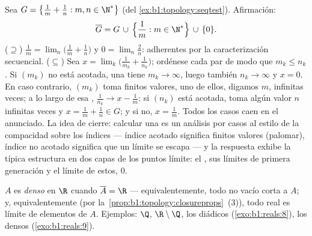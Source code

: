 \begin{example}\label{ex:b1:topology:closurecomputed}
Sea $G = \bigl\{\frac1m + \frac1n : m, n \in \N^*\bigr\}$ (del
\cref{ex:b1:topology:seqtest}). Afirmación:
\[
\overline G = G \,\cup\, \Bigl\{\frac1m : m \in \N^*\Bigr\}
\,\cup\, \{0\} .
\]
($\supseteq$) $\frac1m = \lim_n \bigl(\frac1m + \frac1n\bigr)$ y
$0 = \lim_n \frac2n$: adherentes por la caracterización secuencial.
($\subseteq$) Sea $x = \lim_k \bigl(\frac{1}{m_k} +
\frac{1}{n_k}\bigr)$; ordénese cada par de modo que $m_k \leq n_k$. Si
$(m_k)$ no está acotada, una  tiene $m_k \to \infty$, luego
también $n_k \to \infty$ y $x = 0$. En caso contrario, $(m_k)$ toma
finitos valores, uno de ellos, digamos $m$, infinitas veces; a lo
largo de esa , $\frac{1}{n_k} \to x - \frac1m$: si $(n_k)$
está acotada, toma algún valor $n$ infinitas veces y
$x = \frac1m + \frac1n \in G$; y si no, $x = \frac1m$. Todos los casos
caen en el  anunciado. La idea de cierre: calcular una
 es un análisis por casos al estilo de la compacidad sobre
los índices --- índice acotado significa finitos valores (palomar),
índice no acotado significa que un límite se escapa --- y la respuesta
exhibe la típica estructura en dos capas de los puntos límite: el
, sus límites de primera generación y el límite de estos, $0$.
\end{example}

\begin{definition}\label{def:b1:topology:dense}
$A$ es \emph{denso} en $\R$ cuando $\overline A = \R$
--- equivalentemente, todo   no vacío corta a $A$; y,
equivalentemente (por la~\cref{prop:b1:topology:closureprops}~(3)),
todo real es límite de elementos de $A$. Ejemplos: $\Q$,
$\R \setminus \Q$, los diádicos (\cref{exo:b1:reals:8}), los
 densos (\cref{exo:b1:reals:9}).
\end{definition}

